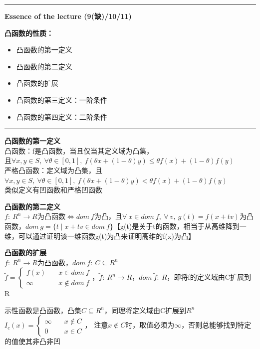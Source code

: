\documentclass[11pt]{ctexart}         %
\begin{document}
\hrule height 4pt
\begin{Large}
	\textbf{Essence of the lecture (9(缺)/10/11)}\\
\end{Large}
\begin{large}
	\textbf{凸函数的性质：} 
\end{large}
\vspace{-16pt}
\begin{itemize} \setlength{\itemsep}{0pt}
	\item 凸函数的第一定义
	\item 凸函数的第二定义
	\item 凸函数的扩展
	\item 凸函数的第三定义：一阶条件
	\item 凸函数的第四定义：二阶条件
\end{itemize}
\hrule height 4pt
\textbf{凸函数的第一定义}\\
凸函数：f是凸函数，当且仅当其定义域为凸集，\\
\phantom{凸函数：}且$\forall x,y\in S,\ \forall \theta\in[0,1],\ f(\theta x+(1-\theta)y)\leq \theta f(x)+(1-\theta)f(y)$\\
严格凸函数：定义域为凸集，且$\forall x,y\in S,\ \forall \theta\in[0,1],\ f(\theta x+(1-\theta)y)< \theta f(x)+(1-\theta)f(y)$\\
类似定义有凹函数和严格凹函数

\textbf{凸函数的第二定义}\\
$f:\ R^n\to R$为凸函数$\Leftrightarrow dom\ f$为凸，且$\forall\ x\in dom\ f,\ \forall\ v,\ g(t)=f(x+tv)$为凸函数，$dom\ g=\{t\mid x+tv\in dom\ f\}$【g(t)是关于t的函数，相当于从高维降到一维，可以通过证明该一维函数g(t)为凸来证明高维的f(x)为凸】

\textbf{凸函数的扩展}\\
$f:\ R^n\to R$为凸函数，$dom\ f:\ C\subseteq R^n$\\ [8pt]
$
\tilde{f}=
\begin{cases}
	f(x) \quad &x\in dom\ f\\
	\infty\quad &x\notin dom\ f
\end{cases}
$，$\tilde{f}:\ R^n\to R$，$dom\ \tilde{f}:\ R$，即将f的定义域由C扩展到R
\vspace{16pt}

示性函数是凸函数，凸集$C\subseteq R^n$，同理将定义域由C扩展到$R^n$\\ [8pt]
$I_c(x)=\begin{cases}
	\infty\quad &x\notin C\\
	0\quad &x\in C
\end{cases}$，
注意$x\notin C$时，取值必须为$\infty$，否则总能够找到特定的值使其非凸非凹
\end{document}
